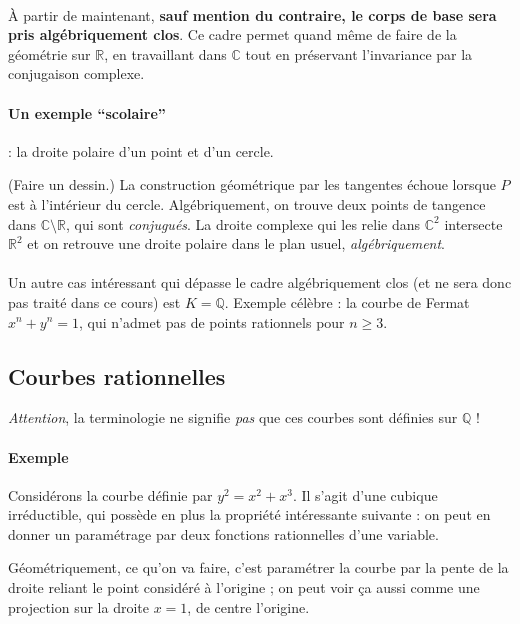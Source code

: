 \documentclass[a4paper, 11pt]{article}
\theoremstyle{definition}
\newcommand{\real}{\mathbb{R}}
\newcommand{\complex}{\mathbb{C}}
\begin{document}
\paragraph{}À partir de maintenant, \textbf{sauf mention du contraire, le corps de
  base sera pris algébriquement clos}. Ce cadre permet quand même de
faire de la géométrie sur $\real$, en travaillant dans $\complex$ tout
en préservant l'invariance par la conjugaison complexe.

\paragraph{Un exemple \enquote{scolaire}} : la droite polaire d'un point et d'un
cercle.

(Faire un dessin.) La construction géométrique par les
tangentes échoue lorsque $P$ est à l'intérieur du
cercle. Algébriquement, on trouve deux points de tangence dans
$\complex\setminus\real$, qui sont \emph{conjugués}. La droite
complexe qui les relie dans $\complex^2$ intersecte $\real^2$ et on
retrouve une droite polaire dans le plan usuel, \emph{algébriquement}.

\paragraph{}Un autre cas intéressant qui dépasse le cadre algébriquement clos (et
ne sera donc pas traité dans ce cours) est $K = \mathbb{Q}$. Exemple
célèbre : la courbe de Fermat $x^n + y^n = 1$, qui n'admet pas de
points rationnels pour $n \geq 3$.

\subsection{Courbes rationnelles}

\emph{Attention}, la terminologie ne signifie \emph{pas} que ces
courbes sont définies sur $\mathbb{Q}$ !

\paragraph{Exemple} Considérons la courbe définie par
$y^2 = x^2 + x^3$. Il s'agit d'une cubique irréductible, qui possède
en plus la propriété intéressante suivante : on peut en donner un
paramétrage par deux fonctions rationnelles d'une variable.

Géométriquement, ce qu'on va faire, c'est paramétrer la courbe par la
pente de la droite reliant le point considéré à l'origine ; on peut
voir ça aussi comme une projection sur la droite $x=1$, de centre
l'origine.
\end{document}
